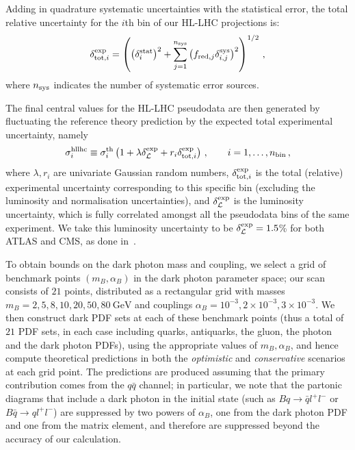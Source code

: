 \documentclass[withindex,glossary]{cam-thesis}
\begin{document}
Adding in quadrature systematic uncertainties with the statistical error,
the total relative uncertainty for the $i$th bin of our HL-LHC projections
is:
\begin{equation}
\delta_{{\rm tot},i}^{\rm exp} = \left( \left( \delta_i^{\rm stat}\right)^2 + \sum_{j=1}^{n_{\rm sys}}
\left( f_{{\rm red},j}\delta_{i,j}^{\rm sys} \right)^2\right)^{1/2} \, ,
\end{equation}
where $n_{\rm sys}$ indicates the number of systematic error sources.

The final central values for the HL-LHC pseudodata are then generated
by fluctuating the reference theory prediction by the expected total experimental
uncertainty, namely
\begin{equation}
  \label{eq:hllhc}
\sigma^{\rm hllhc}_{i} \equiv \sigma^{\rm th}_{i} \left( 1+ \lambda
  \delta_{\cal L}^{\rm exp} +  r_i\delta_{{\rm tot},i}^{\rm exp}   \right) \, , \qquad i=1,\ldots,n_{\rm bin} \, ,
\end{equation}
where $\lambda,r_i$ are univariate Gaussian random numbers, $\delta_{{\rm tot},i}^{\rm exp}$
is the total (relative) experimental uncertainty corresponding to this
specific bin
(excluding the luminosity and normalisation uncertainties), and $\delta_{\cal L}^{\rm exp}$
is the luminosity uncertainty, which is fully correlated amongst all
the pseudodata bins of the same experiment. We take this luminosity uncertainty to be
$\delta_{\cal L}^{\rm exp}=1.5$\%  for both ATLAS and CMS, as done in~\cite{Khalek:2018}.

To obtain bounds on the dark photon mass and coupling, we select a grid of benchmark
points $(m_B, \alpha_B)$ in the dark photon parameter space; our scan consists of $21$ points, distributed as a rectangular grid
with masses $m_B = 2, 5, 8, 10, 20, 50, 80\ \text{GeV}$ and couplings
$\alpha_B = 10^{-3}, 2\times10^{-3}, 3 \times 10^{-3}$. We then construct dark PDF sets at each 
of these benchmark points (thus a total of $21$ PDF sets, in each case including quarks, antiquarks, the gluon, the photon and the dark photon PDFs), using the 
appropriate values of $m_B, \alpha_B$, and hence
compute theoretical predictions in both the \textit{optimistic} and \textit{conservative} scenarios at each grid point. The predictions
are produced assuming that the primary contribution comes from the
$q\bar{q}$ channel; in particular, we note that the partonic diagrams that include a dark
photon in the initial state (such as $Bq\to \bar{q}l^+l^-$ or $B\bar{q}\to
ql^+l^-$) are suppressed by two powers of $\alpha_B$, one from the
dark photon PDF and one from the matrix element, and therefore are
suppressed beyond the accuracy of our calculation. 
\end{document}
